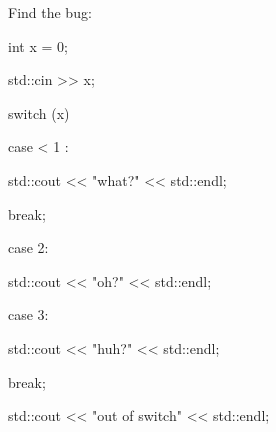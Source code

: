 Find the bug:

\begin{console}

int x = 0;

std::cin >> x;

switch (x)

{

        case < 1 :

             std::cout << "what?" << std::endl;

             break;

             

        case 2:

             std::cout << "oh?" << std::endl;

             

        case 3:

             std::cout << "huh?" << std::endl;

             break;

}

std::cout << "out of switch" << std::endl;

\end{console}

